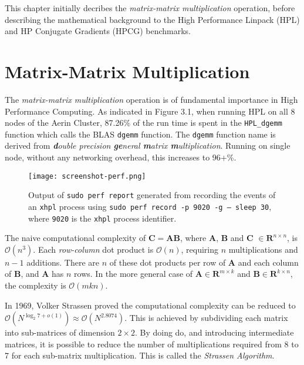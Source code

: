 This chapter initially decribes the \emph{matrix-matrix multiplication} operation, before describing the mathematical background to the High Performance Linpack (HPL) and HP Conjugate Gradients (HPCG) benchmarks.


%
%
\section{Matrix-Matrix Multiplication}

The \emph{matrix-matrix multiplication} operation is of fundamental importance in High Performance Computing. As indicated in Figure 3.1, when running HPL on all 8 nodes of the Aerin Cluster, 87.26\% of the run time is spent in the \verb|HPL_dgemm| function which calls the BLAS \verb|dgemm| function. The \verb|dgemm| function name is derived from \emph{\textbf{d}ouble precision \textbf{ge}neral \textbf{m}atrix \textbf{m}ultiplication}. Running on single node, without any networking overhead, this increases to 96+\%.

\begin{figure}[h]
	\centering	
	\texttt{[image: screenshot-perf.png]}
	\caption{Output of \texttt{sudo perf report} generated from recording the events of an \texttt{xhpl} process using \texttt{sudo perf record -p 9020 -g -- sleep 30}, where \texttt{9020} is the \texttt{xhpl} process identifier.}
\end{figure}

The naive computational complexity of $\mathbf{C} = \mathbf{AB}$, where $\mathbf{A}$, $\mathbf{B}$ and $\mathbf{C}$ $\in \mathbf{R}^{n \times n}$, is $\mathcal{O}(n^3)$. Each \emph{row-column} dot product is $\mathcal{O}(n)$, requiring $n$ multiplications and $n - 1$ additions. There are $n$ of these dot products per row of $\mathbf{A}$ and each column of $\mathbf{B}$, and $\mathbf{A}$ has $n$ rows. In the more general case of $\mathbf{A} \in \mathbf{R}^{m \times k}$ and $\mathbf{B} \in \mathbf{R}^{k \times n}$, the complexity is $\mathcal{O}(mkn).$ 

In 1969, Volker Strassen proved the computational complexity can be reduced to $\mathcal{O}(N^{\log _{2}7+o(1)})\approx \mathcal{O}(N^{2.8074})$. This is achieved by subdividing each matrix into sub-matrices of dimension $2 \times 2$. By doing do, and introducing intermediate matrices, it is possible to reduce the number of multiplications required from 8 to 7 for each sub-matrix multiplication. This is called the \emph{Strassen Algorithm}.

